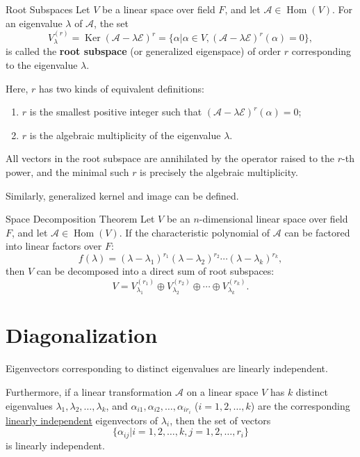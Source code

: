 \documentclass[11pt]{../../TexTemplate/elegantbook} %
\begin{document}
\begin{definition}{Root Subspaces}
    Let \( V \) be a linear space over field \( F \), 
    and let \( \mathcal{A}\in \operatorname{Hom}(V) \).
    For an eigenvalue \( \lambda \) of \( \mathcal{A} \),
    the set
    \[
    V_{\lambda}^{(r)} = \operatorname{Ker}(\mathcal{A} - \lambda \mathcal{E})^{r} = 
    \{ \alpha | \alpha \in V, (\mathcal{A} - \lambda \mathcal{E})^{r}(\alpha) = 0 \},
    \]
    is called the \textbf{root subspace} (or generalized eigenspace) of order \( r \)
    corresponding to the eigenvalue \( \lambda \).
\end{definition}
\begin{remark}
    Here, \(r\) has two kinds of equivalent definitions:
    \begin{enumerate}
        \item \(r\) is the smallest positive integer such that 
            \((\mathcal{A} - \lambda \mathcal{E})^{r}(\alpha) = 0\);
        \item \(r\) is the algebraic multiplicity of the eigenvalue \( \lambda \).
    \end{enumerate}
    All vectors in the root subspace are annihilated by the operator raised to the \(r\)-th power, 
    and the minimal such \(r\) is precisely the algebraic multiplicity.
\end{remark}
Similarly, generalized kernel and image can be defined.

\vspace{0.7cm}

\begin{theorem}{Space Decomposition Theorem}\label{theorem:space_decomposition}
    Let \( V \) be an \( n \)-dimensional linear space over field \( F \), 
    and let \( \mathcal{A}\in \operatorname{Hom}(V) \).
    If the characteristic polynomial of \( \mathcal{A} \) can be factored into linear factors over \( F \):
    \[
    f(\lambda) = ( \lambda - \lambda_1)^{r_1} ( \lambda - \lambda_2)^{r_2} \cdots ( \lambda - \lambda_k)^{r_k},
    \]
    then \(V\) can be decomposed into a direct sum of root subspaces:
    \[
    V = V_{\lambda_1}^{(r_1)} \oplus V_{\lambda_2}^{(r_2)} \oplus \cdots \oplus V_{\lambda_k}^{(r_k)}.
    \]
\end{theorem}





\section{Diagonalization}
\begin{lemma}
    Eigenvectors corresponding to distinct eigenvalues are linearly independent.

    Furthermore, if a linear transformation \( \mathcal{A} \) on a linear space \( V \)
    has \( k \) distinct eigenvalues \( \lambda_1, \lambda_2, \dots, \lambda_k \),
    and \( \alpha_{i1}, \alpha_{i2}, \dots, \alpha_{ir_{i}} \) (\(i = 1, 2, \dots, k\)) 
    are the corresponding \underline{linearly independent} eigenvectors of \( \lambda_i \),
    then the set of vectors
    \[
    \{ \alpha_{ij} | i = 1, 2, \dots, k, j = 1, 2, \dots, r_i \}
    \]
    is linearly independent.
\end{lemma}
\end{document}
